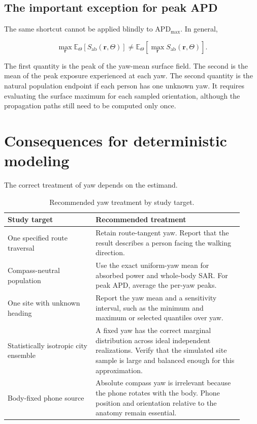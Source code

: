 \documentclass[11pt]{article}
\newcommand{\APDmax}{\mathrm{APD}_{\mathrm{max}}}
\begin{document}
\subsection{The important exception for peak APD}

The same shortcut cannot be applied blindly to $\APDmax$. In general,

\begin{equation}\label{eq:peak-warning}
  \max_{\mathbf{r}}
  \mathbb{E}_{\Theta}[S_{\mathrm{ab}}(\mathbf{r},\Theta)]
  \neq
  \mathbb{E}_{\Theta}
  \left[\max_{\mathbf{r}}S_{\mathrm{ab}}(\mathbf{r},\Theta)\right].
\end{equation}

The first quantity is the peak of the yaw-mean surface field. The second is the
mean of the peak exposure experienced at each yaw. The second quantity is the
natural population endpoint if each person has one unknown yaw. It requires
evaluating the surface maximum for each sampled orientation, although the
propagation paths still need to be computed only once.

\section{Consequences for deterministic modeling}

The correct treatment of yaw depends on the estimand.

\begin{table}[ht]
\centering
\caption{Recommended yaw treatment by study target.}
\label{tab:recommendations}
\begin{tabular}{p{0.34\linewidth}p{0.58\linewidth}}
\toprule
Study target & Recommended treatment \\
\midrule
One specified route traversal
& Retain route-tangent yaw. Report that the result describes a person facing
the walking direction. \\

Compass-neutral population
& Use the exact uniform-yaw mean for absorbed power and whole-body SAR. For
peak APD, average the per-yaw peaks. \\

One site with unknown heading
& Report the yaw mean and a sensitivity interval, such as the minimum and
maximum or selected quantiles over yaw. \\

Statistically isotropic city ensemble
& A fixed yaw has the correct marginal distribution across ideal independent
realizations. Verify that the simulated site sample is large and balanced
enough for this approximation. \\

Body-fixed phone source
& Absolute compass yaw is irrelevant because the phone rotates with the body.
Phone position and orientation relative to the anatomy remain essential. \\
\bottomrule
\end{tabular}
\end{table}
\end{document}
